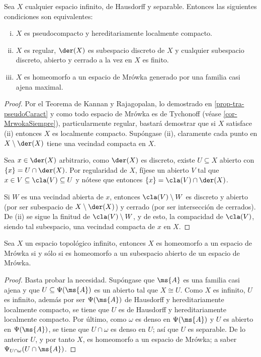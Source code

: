 	\begin{corolario}\label{cor-HLCPseudoCaract}
		Sea $X$ cualquier espacio infinito, de Hausdorff y separable. Entonces las siguientes condiciones son equivalentes:
		\begin{enumerate}[i)]
			\item $X$ es pseudocompacto y hereditariamente localmente compacto.
			\item $X$ es regular, $\der(X)$ es subespacio discreto de $X$ y cualquier subespacio discreto, abierto y cerrado a la vez en $X$ es finito.
			\item $X$ es homeomorfo a un espacio de Mrówka generado por una familia casi ajena maximal.
		\end{enumerate}
	\end{corolario}
	\begin{proof} 
		Por el Teorema de Kannan y Rajagopalan, lo demostrado en \ref{prop-tra-pseudoCaract} y como todo espacio de Mrówka es de Tychonoff (véase \ref{cor-MrwokaSiempre}), particularmente regular, bastará demostrar que si $X$ satisface (ii) entonces $X$ es localmente compacto. Supóngase (ii), claramente cada punto en $X \setminus \der(X)$ tiene una vecindad compacta en $X$.
	
		Sea $x \in \der(X)$ arbitrario, como $\der(X)$ es discreto, existe $U \subseteq X$ abierto con $\{x\} = U \cap \der(X)$. Por regularidad de $X$, fíjese un abierto $V$ tal que $x \in V \subseteq \cla(V) \subseteq U$ y nótese que entonces $\{x\}=\cla(V) \cap \der(X)$.
		
		Si $W$ es una vecindad abierta de $x$, entonces $\cla(V) \setminus W$ es discreto y abierto (por ser subespacio de $X \setminus \der(X)$) y cerrado (por ser intersección de cerrados). De (ii) se sigue la finitud de $\cla(V) \setminus W$, y de esto, la compacidad de $\cla(V)$, siendo tal subespacio, una vecindad compacta de $x$ en $X$.
	\end{proof}
	
	\begin{corolario}
		Sea $X$ un espacio topológico infinito, entonces $X$ es homeomorfo a un espacio de Mrówka si y sólo si es homeomorfo a un subespacio abierto de un espacio de Mrówka.
	\end{corolario}
	\begin{proof} 
		Basta probar la necesidad. Supóngase que $\ms{A}$ es una familia casi ajena y que $U \subseteq \Psi(\ms{A})$ es un abierto tal que $X \cong U$. Como $X$ es infinito, $U$ es infinito, además por ser $\Psi(\ms{A})$ de Hausdorff y hereditariamente localmente compacto, se tiene que $U$ es de Hausdorff y hereditariamente localmente compacto. Por último, como $\omega$ es denso en $\Psi(\ms{A})$ y $U$ es abierto en $\Psi(\ms{A})$, se tiene que $U \cap \omega$ es denso en $U$; así que $U$ es separable. De lo anterior $U$, y por tanto $X$, es homeomorfo a un espacio de Mrówka; a saber $\Psi_{U \cap \omega} (U \cap \ms{A})$.
	\end{proof}
	

